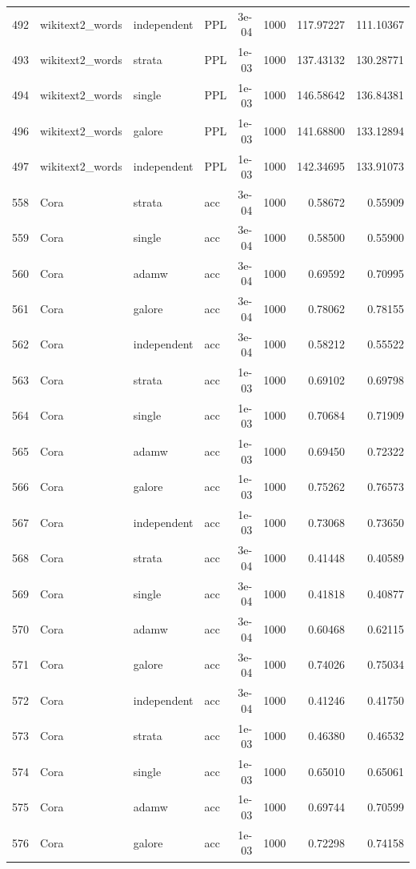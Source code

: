 \begin{longtable}{rlllrrrr}
492 & wikitext2\_words & independent & PPL & 3e-04 & 1000 & 117.97227 & 111.10367 \\
\rowcolor{oursbg}
493 & wikitext2\_words & strata & PPL & 1e-03 & 1000 & 137.43132 & 130.28771 \\
494 & wikitext2\_words & single & PPL & 1e-03 & 1000 & 146.58642 & 136.84381 \\
496 & wikitext2\_words & galore & PPL & 1e-03 & 1000 & 141.68800 & 133.12894 \\
497 & wikitext2\_words & independent & PPL & 1e-03 & 1000 & 142.34695 & 133.91073 \\
\rowcolor{oursbg}
558 & Cora & strata & acc & 3e-04 & 1000 & 0.58672 & 0.55909 \\
559 & Cora & single & acc & 3e-04 & 1000 & 0.58500 & 0.55900 \\
560 & Cora & adamw & acc & 3e-04 & 1000 & 0.69592 & 0.70995 \\
561 & Cora & galore & acc & 3e-04 & 1000 & 0.78062 & 0.78155 \\
562 & Cora & independent & acc & 3e-04 & 1000 & 0.58212 & 0.55522 \\
\rowcolor{oursbg}
563 & Cora & strata & acc & 1e-03 & 1000 & 0.69102 & 0.69798 \\
564 & Cora & single & acc & 1e-03 & 1000 & 0.70684 & 0.71909 \\
565 & Cora & adamw & acc & 1e-03 & 1000 & 0.69450 & 0.72322 \\
566 & Cora & galore & acc & 1e-03 & 1000 & 0.75262 & 0.76573 \\
567 & Cora & independent & acc & 1e-03 & 1000 & 0.73068 & 0.73650 \\
\rowcolor{oursbg}
568 & Cora & strata & acc & 3e-04 & 1000 & 0.41448 & 0.40589 \\
569 & Cora & single & acc & 3e-04 & 1000 & 0.41818 & 0.40877 \\
570 & Cora & adamw & acc & 3e-04 & 1000 & 0.60468 & 0.62115 \\
571 & Cora & galore & acc & 3e-04 & 1000 & 0.74026 & 0.75034 \\
572 & Cora & independent & acc & 3e-04 & 1000 & 0.41246 & 0.41750 \\
\rowcolor{oursbg}
573 & Cora & strata & acc & 1e-03 & 1000 & 0.46380 & 0.46532 \\
574 & Cora & single & acc & 1e-03 & 1000 & 0.65010 & 0.65061 \\
575 & Cora & adamw & acc & 1e-03 & 1000 & 0.69744 & 0.70599 \\
576 & Cora & galore & acc & 1e-03 & 1000 & 0.72298 & 0.74158 \\

\end{longtable}
